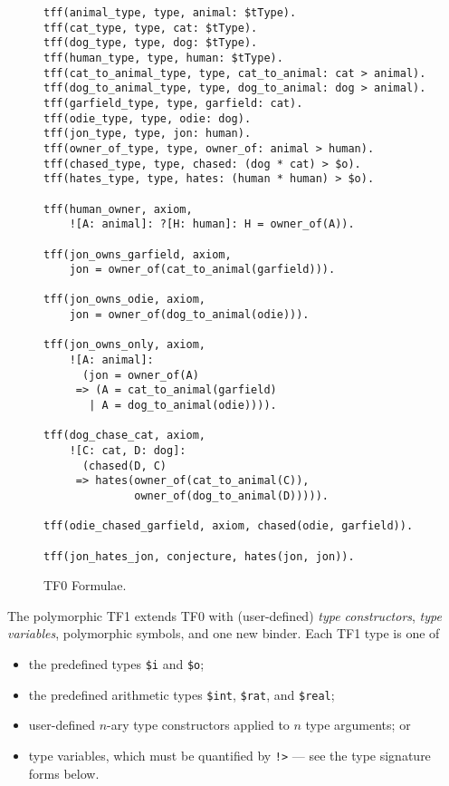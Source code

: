 \begin{figure}[htbp]
\begin{lstlisting}[language=tptp]
tff(animal_type, type, animal: $tType).
tff(cat_type, type, cat: $tType).
tff(dog_type, type, dog: $tType).
tff(human_type, type, human: $tType).
tff(cat_to_animal_type, type, cat_to_animal: cat > animal).
tff(dog_to_animal_type, type, dog_to_animal: dog > animal).
tff(garfield_type, type, garfield: cat).
tff(odie_type, type, odie: dog).
tff(jon_type, type, jon: human).
tff(owner_of_type, type, owner_of: animal > human).
tff(chased_type, type, chased: (dog * cat) > $o).
tff(hates_type, type, hates: (human * human) > $o).

tff(human_owner, axiom,
    ![A: animal]: ?[H: human]: H = owner_of(A)).

tff(jon_owns_garfield, axiom,
    jon = owner_of(cat_to_animal(garfield))).

tff(jon_owns_odie, axiom,
    jon = owner_of(dog_to_animal(odie))).

tff(jon_owns_only, axiom,
    ![A: animal]:
      (jon = owner_of(A)
     => (A = cat_to_animal(garfield)
       | A = dog_to_animal(odie)))).

tff(dog_chase_cat, axiom,
    ![C: cat, D: dog]:
      (chased(D, C)
     => hates(owner_of(cat_to_animal(C)),
              owner_of(dog_to_animal(D))))).

tff(odie_chased_garfield, axiom, chased(odie, garfield)).

tff(jon_hates_jon, conjecture, hates(jon, jon)).
\end{lstlisting}
\caption{TF0 Formulae.}
\label{fig:tfx/TF0Example}
\end{figure}

The polymorphic TF1 extends TF0 with (user-defined) {\em type constructors}, 
{\em type variables}, polymorphic symbols, and one new binder.
Each TF1 type is one of
\begin{itemize}
\item the predefined types \lstinline'$i' and \lstinline'$o';
\item the predefined arithmetic types \lstinline'$int', \lstinline'$rat', and 
      \lstinline'$real';
\item user-defined $n$-ary type constructors applied to $n$ type arguments; or
\item type variables, which must be quantified by \lstinline'!>' --- see the type
      signature forms below.
\end{itemize}

